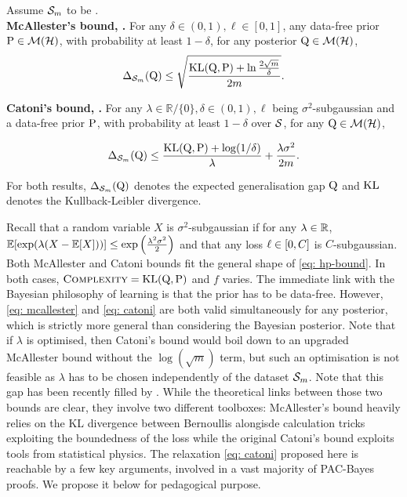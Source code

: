     \begin{proposition}
        \label{prop: mcall-catoni}
        Assume $\Sm$ to be \iid.\\
    \textbf{McAllester's bound, \citep[Theorem 5]{maurer2004note}.}  For any $\delta\in(0,1),\ell\in[0,1]$, any data-free prior $\P\in\Mcal(\Hcal)$, with probability at least $1-\delta$, for any posterior $\Q\in\Mcal(\H)$,
    \begin{align}
    \label{eq: mcallester}
     \Delta_{\Sm}(\Q) \le \sqrt{\frac{\KL(\Q,\P) + \ln{\frac{2\sqrt{m}}{\delta}}}{2m}}.
    \end{align}

    \textbf{Catoni's bound, \citep[Theorem 4.1]{alquier2016properties}.}
    For any $\lambda\in\mathbb{R}/\{0\},\delta\in(0,1),\ell$ being $\sigma^2$-subgaussian and a data-free prior $\P$, with probability at least $1-\delta$ over $\S$, for any $\Q\in \Mcal(\Hcal)$,

  \begin{align}
    \label{eq: catoni}
    \Delta_{\Sm}(\Q) \leq  \frac{\KL(\Q,\P) + \log(1/\delta)}{\lambda} + \frac{\lambda\sigma^2}{2m}.  
  \end{align}

    For both results, $\Delta_{\Sm}(\Q)$ denotes the expected generalisation gap \wrt $\Q$ and $\KL$ denotes the Kullback-Leibler divergence.
    \end{proposition}

Recall that a random variable $X$ is $\sigma^2$-subgaussian if for any $\lambda\in\Rbb$, $\Ebb[\exp(\lambda(X-\Ebb[X]))] \leq \exp\LP \frac{\lambda^2 \sigma^2}{2} \RP$ and that any loss $\loss\in[0,C]$ is $C$-subgaussian. Both McAllester and Catoni bounds fit the general shape of \eqref{eq: hp-bound}. In both cases, $\textsc{Complexity}= \KL(\Q,\P)$ and $f$ varies. The immediate link with the Bayesian philosophy of learning is that the prior has to be data-free. However, \eqref{eq: mcallester} and \eqref{eq: catoni} are both valid simultaneously for any posterior, which is strictly more general than considering the Bayesian posterior. Note that if $\lambda$ is optimised, then Catoni's bound would boil down to an upgraded McAllester bound without the $\log(\sqrt{m})$ term, but such an optimisation is not feasible as $\lambda$ has to be chosen independently of the dataset $\Sm$. 
Note that this gap has been recently filled by \citet[Theorem 33]{dupuis2024generalization}. While the theoretical links between those two bounds are clear, they involve two different toolboxes: McAllester's bound heavily relies on the KL divergence between Bernoullis alongisde calculation tricks exploiting the boundedness of the loss while the original Catoni's bound \citep[Theorem 1.2.6]{catoni2007pac} exploits tools from statistical physics. 
The relaxation \eqref{eq: catoni} proposed here is reachable by a few key arguments, involved in a vast majority of PAC-Bayes proofs. We propose it below for pedagogical purpose. 

